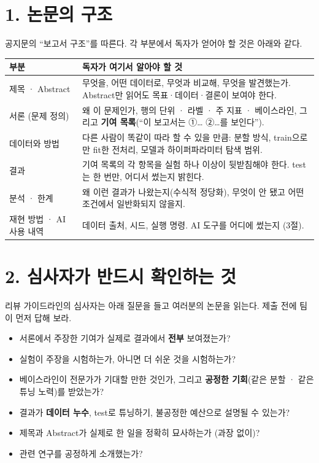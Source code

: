\documentclass[11pt]{article}
\begin{document}
\section*{1. 논문의 구조}
공지문의 ``보고서 구조''를 따른다. 각 부분에서 독자가 얻어야 할 것은 아래와 같다.
\begin{center}
\small
\begin{tabular}{@{}p{3.0cm}p{10.2cm}@{}}
\toprule
\textbf{부분} & \textbf{독자가 여기서 알아야 할 것} \\
\midrule
제목 · Abstract & 무엇을, 어떤 데이터로, 무엇과 비교해, 무엇을 발견했는가. Abstract만 읽어도 목표·데이터·결론이 보여야 한다. \\
서론 (문제 정의) & 왜 이 문제인가, 행의 단위 · 라벨 · 주 지표 · 베이스라인, 그리고 \textbf{기여 목록}(``이 보고서는 ①… ②…를 보인다''). \\
데이터와 방법 & 다른 사람이 똑같이 따라 할 수 있을 만큼: 분할 방식, train으로만 fit한 전처리, 모델과 하이퍼파라미터 탐색 범위. \\
결과 & 기여 목록의 각 항목을 실험 하나 이상이 뒷받침해야 한다. test는 한 번만, 어디서 썼는지 밝힌다. \\
분석 · 한계 & 왜 이런 결과가 나왔는지(수식적 정당화), 무엇이 안 됐고 어떤 조건에서 일반화되지 않을지. \\
재현 방법 · AI 사용 내역 & 데이터 출처, 시드, 실행 명령. AI 도구를 어디에 썼는지 (3절). \\
\bottomrule
\end{tabular}
\end{center}

\section*{2. 심사자가 반드시 확인하는 것}
리뷰 가이드라인의 심사자는 아래 질문을 들고 여러분의 논문을 읽는다. 제출 전에 팀이 먼저 답해 보라.
\begin{itemize}
\item 서론에서 주장한 기여가 실제로 결과에서 \textbf{전부} 보여졌는가?
\item 실험이 주장을 시험하는가, 아니면 더 쉬운 것을 시험하는가?
\item 베이스라인이 전문가가 기대할 만한 것인가, 그리고 \textbf{공정한 기회}(같은 분할 · 같은 튜닝 노력)를 받았는가?
\item 결과가 \textbf{데이터 누수}, test로 튜닝하기, 불공정한 예산으로 설명될 수 있는가?
\item 제목과 Abstract가 실제로 한 일을 정확히 묘사하는가 (과장 없이)?
\item 관련 연구를 공정하게 소개했는가?
\end{itemize}
\end{document}
